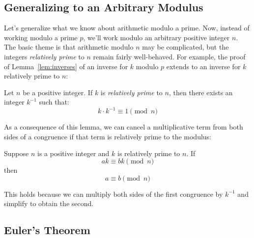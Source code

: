 \subsection{Generalizing to an Arbitrary Modulus}

Let's generalize what we know about arithmetic modulo a prime.  Now,
instead of working modulo a prime $p$, we'll work modulo an arbitrary
positive integer $n$.  The basic theme is that arithmetic modulo $n$ may
be complicated, but the integers {\em relatively prime} to $n$ remain
fairly well-behaved.  For example, the proof of Lemma~\ref{lem:inverses}
of an inverse for $k$ modulo $p$ extends to an inverse for $k$ relatively
prime to $n$:

\begin{lemma}
\label{lem:inverse-arb}
Let $n$ be a positive integer.  If $k$ is \emph{relatively prime} to
$n$, then there exists an integer $k^{-1}$ such that:
%
\[
k \cdot k^{-1} \equiv 1 \pmod{n}
\]
\end{lemma}

As a consequence of this lemma, we can cancel a multiplicative term
from both sides of a congruence if that term is relatively prime to
the modulus:

\begin{corollary}
\label{cor:cancellation-arb}
Suppose $n$ is a positive integer and $k$ is relatively prime to $n$.
If
%
\[
a k \equiv b k \pmod{n}
\]
%
then
%
\[
a \equiv b \pmod{n}
\]
\end{corollary}

This holds because we can multiply both sides of the first congruence
by $k^{-1}$ and simplify to obtain the second.

\subsection{Euler's Theorem}

